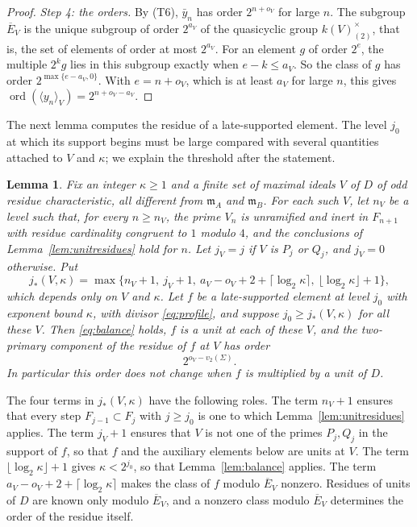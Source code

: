 \documentclass[11pt]{article}
\theoremstyle{plain}
\newtheorem{lemma}[theorem]{Lemma}
\theoremstyle{definition}
\theoremstyle{remark}
\DeclareMathOperator{\ord}{ord}
\newcommand{\EA}{\mathfrak m_A}
\newcommand{\EB}{\mathfrak m_B}
\begin{document}
\begin{proof}
\emph{Step 4: the orders.}  By (T6), $\bar y_n$ has order $2^{n+o_V}$ for
large $n$.  The subgroup $\overline E_V$ is the unique subgroup of order
$2^{a_V}$ of the quasicyclic group $k(V)^\times_{(2)}$, that is, the set
of elements of order at most $2^{a_V}$.  For an element $g$ of order
$2^e$, the multiple $2^kg$ lies in this subgroup exactly when
$e-k\leq a_V$.  So the class of $g$ has order $2^{\max\{e-a_V,0\}}$.
With $e=n+o_V$, which is at least $a_V$ for large $n$, this gives
$\ord(\langle y_n\rangle_V)=2^{n+o_V-a_V}$.
\end{proof}

The next lemma computes the residue of a late-supported element.  The
level $j_0$ at which its support begins must be large compared with
several quantities attached to $V$ and $\kappa$; we explain the threshold
after the statement.

\begin{lemma}\label{lem:profile}
Fix an integer $\kappa\geq1$ and a finite set of maximal ideals $V$ of $D$
of odd residue characteristic, all different from $\EA$ and $\EB$.  For
each such $V$, let $n_V$ be a level such that, for every $n\geq n_V$,
the prime $V_n$ is unramified and inert in $F_{n+1}$ with residue
cardinality congruent to $1$ modulo $4$, and the conclusions of
Lemma~\ref{lem:unitresidues} hold for $n$.  Let $j_V=j$ if $V$ is $P_j$
or $Q_j$, and $j_V=0$ otherwise.  Put
\[
 j_*(V,\kappa)=\max\{n_V+1,\ j_V+1,\
   a_V-o_V+2+\lceil\log_2\kappa\rceil,\ \lfloor\log_2\kappa\rfloor+1\},
\]
which depends only on $V$ and $\kappa$.  Let $f$ be a late-supported
element at level $j_0$ with exponent bound $\kappa$, with divisor
\eqref{eq:profile}, and suppose $j_0\geq j_*(V,\kappa)$ for all these
$V$.  Then \eqref{eq:balance} holds, $f$ is a unit at each of these $V$,
and the two-primary component of the residue of $f$ at $V$ has order
\begin{equation}\label{eq:resorder}
 2^{o_V-v_2(\Sigma)}.
\end{equation}
In particular this order does not change when $f$ is multiplied by a
unit of $D$.
\end{lemma}

The four terms in $j_*(V,\kappa)$ have the following roles.  The term
$n_V+1$ ensures that every step $F_{j-1}\subset F_j$ with $j\geq j_0$ is
one to which Lemma~\ref{lem:unitresidues} applies.  The term $j_V+1$
ensures that $V$ is not one of the primes $P_j,Q_j$ in the support of
$f$, so that $f$ and the auxiliary elements below are units at $V$.  The
term $\lfloor\log_2\kappa\rfloor+1$ gives $\kappa<2^{j_0}$, so that
Lemma~\ref{lem:balance} applies.  The term
$a_V-o_V+2+\lceil\log_2\kappa\rceil$ makes the class of $f$ modulo
$\overline E_V$ nonzero.  Residues of units of $D$ are known only modulo
$\overline E_V$, and a nonzero class modulo $\overline E_V$ determines the
order of the residue itself.
\end{document}

